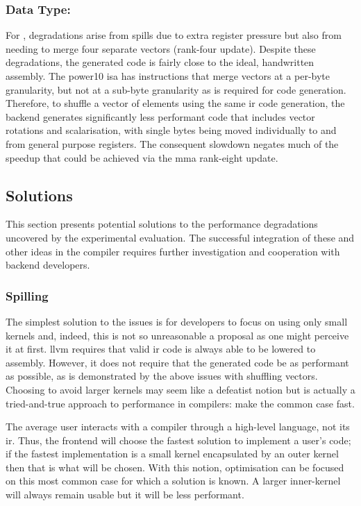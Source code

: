 \documentclass[\main/thesis.tex]{subfiles}
\begin{document}
\subsubsection{Data Type: \texorpdfstring{}{i4}}
For , degradations arise from \glspl{spill} due to extra register pressure but also from needing to merge four separate vectors (rank-four update).
Despite these degradations, the generated code is fairly close to the ideal, handwritten assembly.
The \gls{power10} \gls{isa} has instructions that merge vectors at a per-byte granularity, but not at a sub-byte granularity as is required for  code generation.
Therefore, to shuffle a vector of  elements using the same \gls{ir} code generation, the backend generates significantly less performant code that includes vector rotations and scalarisation, with single bytes being moved individually to and from general purpose registers.
The consequent slowdown negates much of the speedup that could be achieved via the \gls{mma} rank-eight update.

\subsection{Solutions}
This section presents potential solutions to the performance degradations uncovered by the experimental evaluation.
The successful integration of these and other ideas in the compiler requires further investigation and cooperation with backend developers.

\subsubsection{Spilling}
\label{sec:spillSolution}
The simplest solution to the  issues is for developers to focus on using only small kernels and, indeed, this is not so unreasonable a proposal as one might perceive it at first.
\gls{llvm} requires that valid \gls{ir} code is always able to be lowered to assembly.
However, it does not require that the generated code be as performant as possible, as is demonstrated by the above issues with shuffling  vectors.
Choosing to avoid larger kernels may seem like a defeatist notion but is actually a tried-and-true approach to performance in compilers: make the common case fast.

The average user interacts with a compiler through a high-level language, not its \gls{ir}.
Thus, the frontend will choose the fastest solution to implement a user's code; if the fastest implementation is a small kernel encapsulated by an outer kernel then that is what will be chosen.
With this notion, optimisation can be focused on this most common case for which a solution is known.
A larger inner-kernel will always remain usable but it will be less performant.
\end{document}
